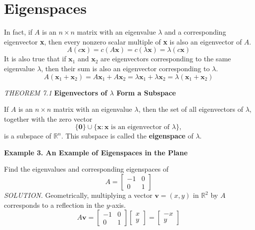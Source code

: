 \documentclass{article}
\newcommand\R{\mathbb{R}}
\begin{document}
    \section{Eigenspaces}
    In fact, if $A$ is an $n \times n$ matrix with an eigenvalue $\lambda$ and a corresponding eigenvector \textbf{x}, then every 
    nonzero scalar multiple of \textbf{x} is also an eigenvector of $A$. 
    \[A(c \textbf{x}) = c(A \textbf{x}) = c( \lambda \textbf{x} ) = \lambda (c \textbf{x}) \]
    It is also true that if $ \textbf{x}_1$ and $ \textbf{x}_2$ are eigenvectors corresponding to the same 
    eigenvalue $\lambda$, then their sum is also an eigenvector corresponding to $\lambda$.
    \[A( \textbf{x}_1 + \textbf{x}_2 ) = A \textbf{x}_1 + A \textbf{x}_2 = \lambda  \textbf{x}_1 + \lambda \textbf{x}_2 = \lambda( \textbf{x}_1 + \textbf{x}_2 ) \]
    \begin{tcolorbox}[colback = {blue9}]
        \textit{THEOREM 7.1} \textbf{Eigenvectors of $ \lambda$ Form a Subspace}

        If $A$ is an $n \times n$ matrix with an eigenvalue $ \lambda$, then the set of all eigenvectors of $ \lambda$, together
        with the zero vector
        \[\{ \textbf{0} \} \cup \{ \textbf{x}: \textbf{x} \text{ is an eigenvector of } \lambda\} ,\]
        is a subspace of $ \R^n $. This subspace is called the \textbf{eigenspace} of $ \lambda$.
    \end{tcolorbox}
    \textbf{Example 3. \textcolor{blue5}{An Example of Eigenspaces in the Plane}}

    Find the eigenvalues and corresponding eigenspaces of 
    \[A = \begin{bmatrix}
        -1 & 0 \\
        0 & 1
    \end{bmatrix}\]
    \textit{\textcolor{blue5}{SOLUTION.}} Geometrically, multiplying a vector  $ \textbf{v} = (x,y)$ in $ \R^2 $ by $A$   corresponds
    to a reflection in the $y$-axis.
    \[A \textbf{v} = \begin{bmatrix}
        -1 & 0 \\
        0 & 1
    \end{bmatrix} \begin{bmatrix}
        x \\ y
    \end{bmatrix} = \begin{bmatrix}
        -x \\ y
    \end{bmatrix} \]
\end{document}
